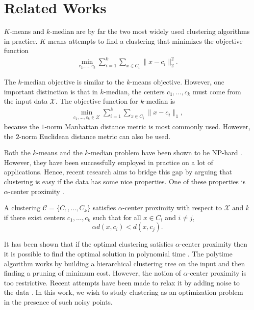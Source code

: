 \documentclass{article}
\newcommand{\mc}{\mathcal}
\begin{document}
\section{Related Works}
$K$-means and $k$-median are by far the two most widely used clustering algorithms in practice. $K$-means attempts to find a clustering that minimizes the objective function
\begin{align*}
	\min_{c_1, \ldots, c_k} \sum_{i=1}^k \sum_{x \in C_i} \|x-c_i\|_2^2 .
\end{align*}

The $k$-median objective is similar to the $k$-means objective. However, one important distinction is that in $k$-median, the centers $c_1, \ldots, c_k$ must come from the input data $\mc X$. The objective function for $k$-median is
\begin{align*}
	\min_{c_1, \ldots, c_k \in \mc X} \sum_{i=1}^k \sum_{x \in C_i} \|x-c_i\|_1 ,
\end{align*}
because the $1$-norm Manhattan distance metric is most commonly used. However, the $2$-norm Euclidean distance metric can also be used. 

Both the $k$-means and the $k$-median problem have been shown to be NP-hard \cite{kmeans}\cite{kmeans2}\cite{kmed}. However, they have been successfully employed in practice on a lot of applications. Hence, recent research aims to bridge this gap by arguing that clustering is easy if the data has some nice properties. One of these properties is $\alpha$-center proximity \cite{alphacenter}. 

A clustering $\mc C = \{C_1, \ldots, C_k\}$ satisfies $\alpha$-center proximity with respect to $\mc X$ and $k$ if there exist centers $c_1, \ldots, c_k$  such that for all $x \in C_i$ and $i\neq j$, $$\alpha d(x, c_i) < d(x, c_j).$$

It has been shown that if the optimal clustering satisfies $\alpha$-center proximity then it is possible to find the optimal solution in polynomial time \cite{Balcan}. The polytime algorithm works by building a hierarchical clustering tree on the input and then finding a pruning of minimum cost. However, the notion of $\alpha$-center proximity is too restrictive. Recent attempts have been made to relax it by adding noise to the data \cite{noise1}\cite{noise2}. In this work, we wish to study clustering as an optimization problem in the presence of such noisy points.  
\end{document}
